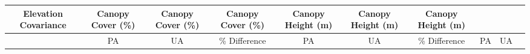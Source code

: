 \documentclass[10pt,oneside]{article}
\begin{document}
\begin{longtable}[]{@{}cccccccccc@{}}
\begin{minipage}[b]{0.08\columnwidth}
Elevation Covariance\strut
\end{minipage} & \begin{minipage}[b]{0.07\columnwidth}\centering
Canopy Cover (\%)\strut
\end{minipage} & \begin{minipage}[b]{0.07\columnwidth}\centering
Canopy Cover (\%)\strut
\end{minipage} & \begin{minipage}[b]{0.07\columnwidth}\centering
Canopy Cover (\%)\strut
\end{minipage} & \begin{minipage}[b]{0.08\columnwidth}\centering
Canopy Height (m)\strut
\end{minipage} & \begin{minipage}[b]{0.08\columnwidth}\centering
Canopy Height (m)\strut
\end{minipage} & \begin{minipage}[b]{0.08\columnwidth}\centering
Canopy Height (m)\strut
\end{minipage}\tabularnewline
\midrule
\endhead
\begin{minipage}[t]{0.04\columnwidth}\centering
\strut
\end{minipage} & \begin{minipage}[t]{0.08\columnwidth}\centering
PA\strut
\end{minipage} & \begin{minipage}[t]{0.08\columnwidth}\centering
UA\strut
\end{minipage} & \begin{minipage}[t]{0.08\columnwidth}\centering
\% Difference\strut
\end{minipage} & \begin{minipage}[t]{0.07\columnwidth}\centering
PA\strut
\end{minipage} & \begin{minipage}[t]{0.07\columnwidth}\centering
UA\strut
\end{minipage} & \begin{minipage}[t]{0.07\columnwidth}\centering
\% Difference\strut
\end{minipage} & \begin{minipage}[t]{0.08\columnwidth}\centering
PA\strut
\end{minipage} & \begin{minipage}[t]{0.08\columnwidth}\centering
UA\strut
\end{minipage} & \begin{minipage}[t]{0.08\columnwidth}\centering

\end{minipage}
\end{longtable}
\end{document}
